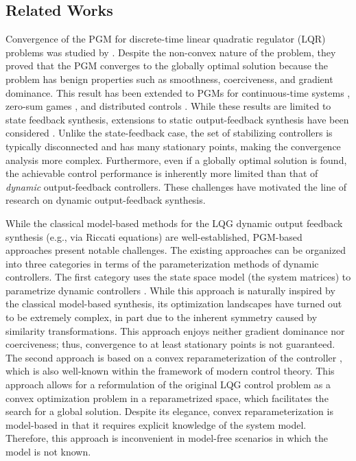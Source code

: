 \documentclass[preprint,5p,times,twocolumn]{elsarticle}
\begin{document}
\subsection*{Related Works}
Convergence of the PGM for discrete-time linear quadratic regulator (LQR) problems was studied by \cite{fazel}. Despite the non-convex nature of the problem, they proved that the PGM converges to the globally optimal solution because the problem has benign properties such as smoothness, coerciveness, and gradient dominance. This result has been extended to PGMs for continuous-time systems \cite{mohammadi2019global, Mih3}, zero-sum games \cite{bu2019global}, and distributed controls \cite{li2021distributed}. While these results are limited to state feedback synthesis, extensions to static output-feedback synthesis have been considered \cite{fatkhullin2021optimizing,takakura2022structured,bu2019topological,duan2023optimization}. Unlike the state-feedback case, the set of stabilizing controllers is typically disconnected and has many stationary points, making the convergence analysis more complex. Furthermore, even if a globally optimal solution is found, the achievable control performance is inherently more limited than that of {\it dynamic} output-feedback controllers. These challenges have motivated the line of research on dynamic output-feedback synthesis. 


While the classical model-based methods for the LQG dynamic output feedback synthesis (e.g., via Riccati equations) are well-established, PGM-based approaches present notable challenges. 
The existing approaches can be organized into three categories in terms of the parameterization methods of dynamic controllers. 
The first category uses the state space model (the system matrices) to parametrize dynamic controllers \cite{tang2021analysis, duan2022optimization, hu2023toward, zheng2023benign}. 
While this approach is naturally inspired by the classical model-based synthesis, its optimization landscapes have turned out to be extremely complex, in part due to the inherent symmetry caused by similarity transformations. This approach enjoys neither gradient dominance nor coerciveness; thus, convergence to at least stationary points is not guaranteed. The second approach is based on a convex reparameterization of the controller \cite{mohammadi2019global,sun2021learning}, which is also well-known within the framework of modern control theory. 
This approach allows for a reformulation of the original LQG control problem as a convex optimization problem in a reparametrized space, which facilitates the search for a global solution. Despite its elegance, convex reparameterization is model-based in that it requires explicit knowledge of the system model. Therefore, this approach is inconvenient in model-free scenarios in which the model is not known.
\end{document}
